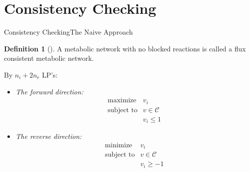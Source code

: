 \documentclass[10pt]{beamer}
\theoremstyle{remark}
\theoremstyle{definition}
\newtheorem{dfn}{Definition}
\begin{document}
\section{Consistency Checking}
\begin{frame}{Consistency Checking}{The Naive Approach}

\begin{dfn}[\cite{schuster1994elementary}]
A metabolic network with no blocked reactions is called a flux
consistent metabolic network.
\end{dfn}\pause

By $n_i + 2 n_r$ LP's:\pause
  \begin{itemize}
    \item \textit{The forward direction:}
    \[
	\begin{array}{ll}
	\mbox{maximize}		& v_i \\
	\mbox{subject to}	& v \in \mathcal{C}\\
						& v_i \leq 1
	\end{array}
	\]\pause
    \item \textit{The reverse direction:} 
    \[
	\begin{array}{ll}
	\mbox{minimize}		& v_i \\
	\mbox{subject to}	& v \in \mathcal{C}\\
						& v_i \geq -1
	\end{array}
	\]
  \end{itemize}

\end{frame}
\end{document}

